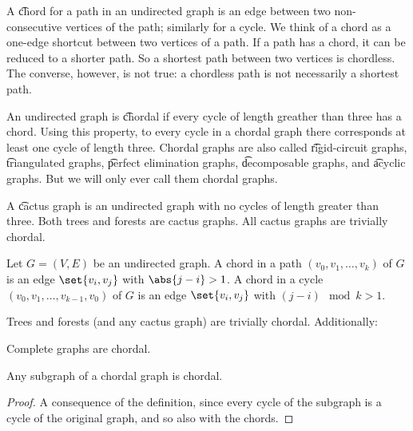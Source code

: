 

A \t{chord} for a path in an undirected graph is an edge between two non-consecutive vertices of the path; similarly for a cycle.
We think of a chord as a one-edge shortcut between two vertices of a path.
If a path has a chord, it can be reduced to a shorter path.
So a shortest path between two vertices is chordless.
The converse, however, is not true: a chordless path is not necessarily a shortest path.

An undirected graph is \t{chordal} if every cycle of length greather than three has a chord.
Using this property, to every cycle in a chordal graph there corresponds at least one cycle of length three.
Chordal graphs are also called \t{rigid-circuit graphs}, \t{triangulated graphs}, \t{perfect elimination graphs}, \t{decomposable graphs}, and \t{acyclic graphs}.
But we will only ever call them chordal graphs.

A \t{cactus graph} is an undirected graph with no cycles of length greater than three.
Both trees and forests are cactus graphs.
All cactus graphs are trivially chordal.



Let $G = (V, E)$ be an undirected graph.
A chord in a path $(v_0, v_1, \dots, v_k)$ of $G$ is an edge $\set{v_i, v_j}$ with $\abs{j - i} > 1$.
A chord in a cycle $(v_0, v_1, \dots, v_{k-1}, v_0)$ of $G$ is an edge $\set{v_i, v_j}$ with $(j - i) \mod k > 1$.


Trees and forests (and any cactus graph) are trivially chordal.
Additionally:

\begin{prop}
  Complete graphs are chordal.
\end{prop}


\begin{prop}
  Any subgraph of a chordal graph is chordal.

  \begin{proof}
    A consequence of the definition, since every cycle of the subgraph is a cycle of the original graph, and so also with the chords.
  \end{proof}
\end{prop}
